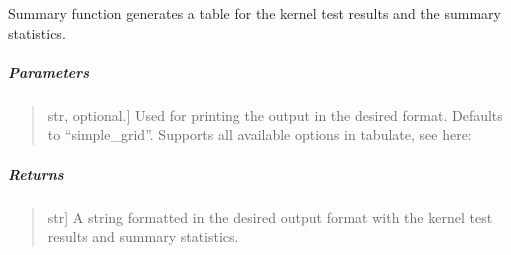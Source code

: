 \documentclass[letterpaper,10pt,english,openany,oneside]{sphinxmanual}
\begin{document}
{{{{\begin{fulllineitems}
\begin{quote}
\begin{description}
\end{description}
\end{quote}

\end{fulllineitems}


\begin{fulllineitems}
\label{\detokenize{api_reference/generated/QuadratiK.kernel_test.KernelTest:QuadratiK.kernel_test.KernelTest.summary}}
\pysigstartsignatures
{}
\pysigstopsignatures
\sphinxAtStartPar
Summary function generates a table for the kernel test results and the summary statistics.


\subparagraph{Parameters}
\label{\detokenize{api_reference/generated/QuadratiK.kernel_test.KernelTest:id1}}\begin{quote}
\begin{description}
\sphinxlineitem{print\_fmt}{[}str, optional.{]}
\sphinxAtStartPar
Used for printing the output in the desired format. Defaults to “simple\_grid”.
Supports all available options in tabulate, see here: 

\end{description}
\end{quote}


\subparagraph{Returns}
\label{\detokenize{api_reference/generated/QuadratiK.kernel_test.KernelTest:id2}}\begin{quote}
\begin{description}
\sphinxlineitem{summary}{[}str{]}
\sphinxAtStartPar
A string formatted in the desired output
format with the kernel test results and summary statistics.

\end{description}
\end{quote}

\end{fulllineitems}


}}}}
\end{document}
